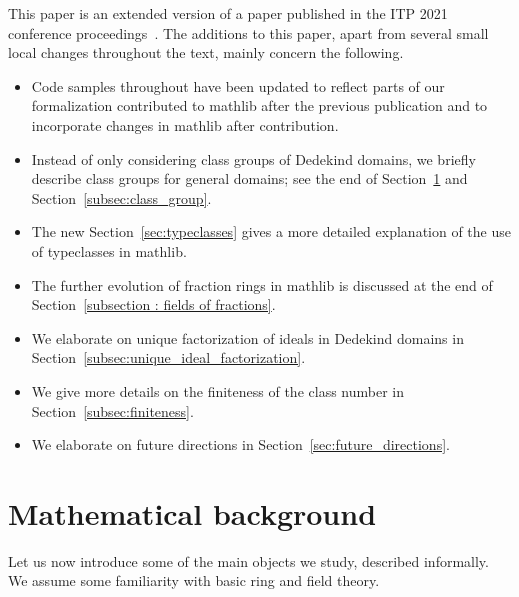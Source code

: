 \documentclass[sn-mathphys]{sn-jnl}%
\newcommand{\mathlib}{\textsf{mathlib}\xspace}
\begin{document}
This paper is an extended version of a paper published in the ITP 2021 conference proceedings~\cite{ClassGroupsITP2021}. The additions to this paper, apart from several small local changes throughout the text, mainly concern the following.
\begin{itemize}
 \item Code samples throughout have been updated to reflect parts of our formalization contributed to \mathlib after the previous publication and to incorporate changes in \mathlib after contribution.
 \item Instead of only considering class groups of Dedekind domains, we briefly describe class groups for general domains; see the end of Section~\ref{sec math background} and Section~\ref{subsec:class_group}.
 \item The new Section~\ref{sec:typeclasses} gives a more detailed explanation of the use of typeclasses in \mathlib.
 \item The further evolution of fraction rings in \mathlib is discussed at the end of Section~\ref{subsection : fields of fractions}.
 \item We elaborate on unique factorization of ideals in Dedekind domains in Section~\ref{subsec:unique_ideal_factorization}.
 \item We give more details on the finiteness of the class number in Section~\ref{subsec:finiteness}.
 \item We elaborate on future directions in Section~\ref{sec:future_directions}.
\end{itemize}

\section{Mathematical background}\label{sec math background}

Let us now introduce some of the main objects we study, described informally. We assume some familiarity with basic ring and field theory.
\end{document}
